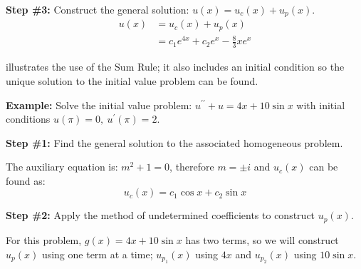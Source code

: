 \vspace{0.25cm}
\noindent\textbf{Step \#3:} Construct the general solution: $u(x)=u_c(x)+u_p(x)$.
\begin{align*}
u(x) &= u_c(x)+u_p(x) \\
&=c_1e^{4x}+c_2e^x - \frac{8}{3}xe^{x}
\end{align*}

 illustrates the use of the Sum Rule; it also includes an initial condition so the unique solution to the initial value problem can be found.

\vspace{0.25cm}

\noindent\textbf{Example:} Solve the initial value problem: $u^{\prime \prime}+u=4x+10\sin{x}$ with initial conditions $u(\pi)=0, \ u^{\prime}(\pi)=2$.

\vspace{0.25cm}

\noindent\textbf{Step \#1:} Find the general solution to the associated homogeneous problem.

\vspace{0.25cm}

\noindent The auxiliary equation is: $m^2+1=0$, therefore $m=\pm i$ and $u_c(x)$ can be found as:
\begin{equation*}
u_c(x) = c_1\cos{x}+c_2\sin{x}
\end{equation*}

\vspace{0.25cm}

\noindent\textbf{Step \#2:} Apply the method of undetermined coefficients to construct $u_p(x)$.

\vspace{0.25cm}

\noindent For this problem, $g(x) = 4x+10\sin{x}$ has two terms, so we will construct $u_p(x)$ using one term at a time; $u_{p_1}(x)$ using $4x$ and $u_{p_2}(x)$ using $10\sin{x}$.  

\vspace{0.25cm}

